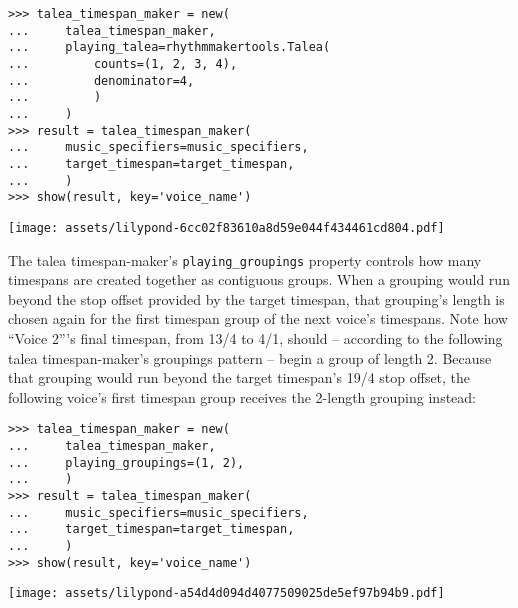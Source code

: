 \begin{abjadbookoutput}
\begin{singlespacing}
\vspace{-0.5\baselineskip}
\begin{lstlisting}
>>> talea_timespan_maker = new(
...     talea_timespan_maker,
...     playing_talea=rhythmmakertools.Talea(
...         counts=(1, 2, 3, 4),
...         denominator=4,
...         )
...     )
>>> result = talea_timespan_maker(
...     music_specifiers=music_specifiers,
...     target_timespan=target_timespan,
...     )
>>> show(result, key='voice_name')
\end{lstlisting}
\noindent\texttt{[image: assets/lilypond-6cc02f83610a8d59e044f434461cd804.pdf]}
\end{singlespacing}
\end{abjadbookoutput}

\noindent The talea timespan-maker's \texttt{playing\_groupings} property
controls how many timespans are created together as contiguous groups. When a
grouping would run beyond the stop offset provided by the target timespan, that
grouping's length is chosen again for the first timespan group of the next
voice's timespans. Note how \enquote{Voice 2}'s final timespan, from 13/4 to
4/1, should -- according to the following talea timespan-maker's groupings
pattern -- begin a group of length 2. Because that grouping would run beyond
the target timespan's 19/4 stop offset, the following voice's first timespan
group receives the 2-length grouping instead:

\begin{comment}
<abjad>
talea_timespan_maker = new(
    talea_timespan_maker,
    playing_groupings=(1, 2),
    )
result = talea_timespan_maker(
    music_specifiers=music_specifiers,
    target_timespan=target_timespan,
    )
show(result, key='voice_name')
</abjad>
\end{comment}

\begin{abjadbookoutput}
\begin{singlespacing}
\vspace{-0.5\baselineskip}
\begin{lstlisting}
>>> talea_timespan_maker = new(
...     talea_timespan_maker,
...     playing_groupings=(1, 2),
...     )
>>> result = talea_timespan_maker(
...     music_specifiers=music_specifiers,
...     target_timespan=target_timespan,
...     )
>>> show(result, key='voice_name')
\end{lstlisting}
\noindent\texttt{[image: assets/lilypond-a54d4d094d4077509025de5ef97b94b9.pdf]}
\end{singlespacing}
\end{abjadbookoutput}

